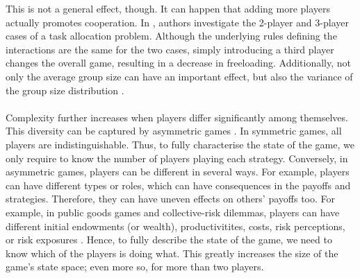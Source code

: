 \documentclass[11pt]{article}
\theoremstyle{plainCl1}
\theoremstyle{plainCl2}
\begin{document}
This is not a general effect, though. It can happen that adding more players actually promotes cooperation. In \cite{gokhale:JTB:2011}, authors investigate the 2-player and 3-player cases of a task allocation problem. Although the underlying rules defining the interactions are the same for the two cases, simply introducing a third player changes the overall game, resulting in a decrease in freeloading.
Additionally, not only the average group size can have an important effect, but also the variance of the group size distribution \cite{Pena:Evolution:2011, Broom:BMB:2019}.
\\ \\ 
\noindent Complexity further increases when players differ significantly among themselves. This diversity can be captured by asymmetric games \cite{Taylor:JAP:1979, Schuster:AB:1981, Gaunersdorfer:TPB:1991, Hofbauer:JMB:1996, Hofbauer:GEB:2005, Ohtsuki:JTB:2010, McAvoy:PlosCB:2015, Veller:JET:2016, Hauser:Nature:2019}. In symmetric games, all players are indistinguishable. Thus, to fully characterise the state of the game, we only require to know the number of players playing each strategy. Conversely, in asymmetric games, players can be different in several ways. For example, players can have different types or roles, which can have consequences in the payoffs and strategies. Therefore, they can have uneven effects on others' payoffs too. For example, in public goods games and collective-risk dilemmas, players can have different initial endowments (or wealth), productivitites, costs, risk perceptions, or risk exposures \cite{Milinski:CC:2011, Vasconcelos:PNAS:2014, Abouchakra:JTB:2014, Hauser:Nature:2019, Merhej:JAIR:2022}. Hence, to fully describe the state of the game, we need to know which of the players is doing what. This greatly increases the size of the game's state space; even more so, for more than two players.  \\ \\ 
\end{document}
